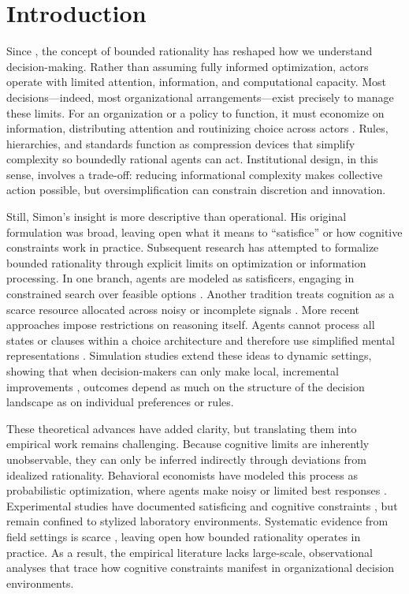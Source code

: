 \section{Introduction}\label{sec_intro}

Since \citet{Simon1955}, the concept of bounded rationality has reshaped how we understand decision-making. Rather than assuming fully informed optimization, actors operate with limited attention, information, and computational capacity. Most decisions---indeed, most organizational arrangements---exist precisely to manage these limits. For an organization or a policy to function, it must economize on information, distributing attention and routinizing choice across actors \citep{CyertMarch1963}. Rules, hierarchies, and standards function as compression devices that simplify complexity so boundedly rational agents can act. Institutional design, in this sense, involves a trade-off: reducing informational complexity makes collective action possible, but oversimplification can constrain discretion and innovation.

Still, Simon's insight is more descriptive than operational. His original formulation was broad, leaving open what it means to ``satisfice'' or how cognitive constraints work in practice. Subsequent research has attempted to formalize bounded rationality through explicit limits on optimization or information processing. In one branch, agents are modeled as satisficers, engaging in constrained search over feasible options \citep{Stigler1961,Rubinstein1986,Salant2011}. Another tradition treats cognition as a scarce resource allocated across noisy or incomplete signals \citep{Radner1993,VanZandt1999,Sims2003}. More recent approaches impose restrictions on reasoning itself. Agents cannot process all states or clauses within a choice architecture and therefore use simplified mental representations \citep{ZhangLevin2017,Jakobsen2020}. Simulation studies extend these ideas to dynamic settings, showing that when decision-makers can only make local, incremental improvements \citep{Levinthal1997,MarengoDosi2005,Richters2021}, outcomes depend as much on the structure of the decision landscape as on individual preferences or rules.

These theoretical advances have added clarity, but translating them into empirical work remains challenging. Because cognitive limits are inherently unobservable, they can only be inferred indirectly through deviations from idealized rationality. Behavioral economists have modeled this process as probabilistic optimization, where agents make noisy or limited best responses \citep{McKelveyPalfrey1995,CamererHoChong2004}. Experimental studies have documented satisficing and cognitive constraints \citep{Guth2010,LimMatrosTurocy2014,AlaouiJanezicPenta2020}, but remain confined to stylized laboratory environments. Systematic evidence from field settings is scarce \citep{Kirman2010,FehrSchmidt1999}, leaving open how bounded rationality operates in practice. As a result, the empirical literature lacks large-scale, observational analyses that trace how cognitive constraints manifest in organizational decision environments.

